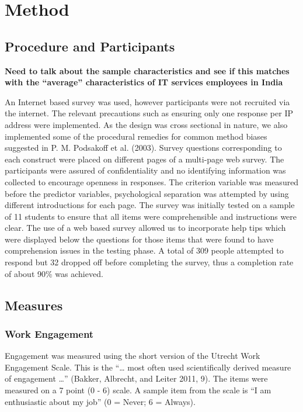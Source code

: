 \documentclass[12pt,a4paper,]{article}
\begin{document}
\section{Method}\label{method}

\subsection{Procedure and
Participants}\label{procedure-and-participants}

\textbf{Need to talk about the sample characteristics and see if this
matches with the ``average'' characteristics of IT services employees in
India}

An Internet based survey was used, however participants were not
recruited via the internet. The relevant precautions such as ensuring
only one response per IP address were implemented. As the design was
cross sectional in nature, we also implemented some of the procedural
remedies for common method biases suggested in P. M. Podsakoff et al.
(2003). Survey questions corresponding to each construct were placed on
different pages of a multi-page web survey. The participants were
assured of confidentiality and no identifying information was collected
to encourage openness in responses. The criterion variable was measured
before the predictor variables, psychological separation was attempted
by using different introductions for each page. The survey was initially
tested on a sample of 11 students to ensure that all items were
comprehensible and instructions were clear. The use of a web based
survey allowed us to incorporate help tips which were displayed below
the questions for those items that were found to have comprehension
issues in the testing phase. A total of 309 people attempted to respond
but 32 dropped off before completing the survey, thus a completion rate
of about 90\% was achieved.

\subsection{Measures}\label{measures}

\subsubsection{Work Engagement}\label{work-engagement}

Engagement was measured using the short version of the Utrecht Work
Engagement Scale. This is the ``\ldots{} most often used scientifically
derived measure of engagement \ldots{}'' (Bakker, Albrecht, and Leiter
2011, 9). The items were measured on a 7 point (0 - 6) scale. A sample
item from the scale is ``I am enthusiastic about my job'' (0 = Never; 6
= Always).
\end{document}
